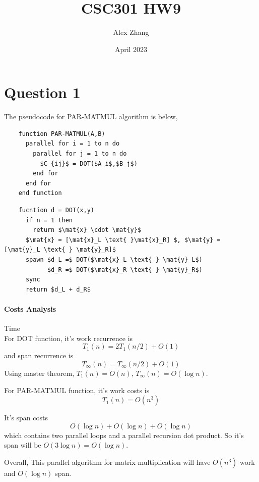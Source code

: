 \documentclass{article}
\title{CSC301 HW9}
\author{Alex Zhang}
\date{April 2023}
\newcommand{\mat}[1]{\mathbf{#1}}
\begin{document}
\maketitle

\section*{Question 1}

The pseudocode for PAR-MATMUL algorithm is below,
\begin{multicols}{2}
  \begin{lstlisting}
    function PAR-MATMUL(A,B)
      parallel for i = 1 to n do
        parallel for j = 1 to n do
          $C_{ij}$ = DOT($A_i$,$B_j$)
        end for
      end for
    end function
  \end{lstlisting}
  \begin{lstlisting}
    fucntion d = DOT(x,y)
      if n = 1 then
        return $\mat{x} \cdot \mat{y}$
      $\mat{x} = [\mat{x}_L \text{ }\mat{x}_R] $, $\mat{y} = [\mat{y}_L \text{ } \mat{y}_R]$
      spawn $d_L =$ DOT($\mat{x}_L \text{ } \mat{y}_L$)
            $d_R =$ DOT($\mat{x}_R \text{ } \mat{y}_R$)
      sync 
      return $d_L + d_R$ 
  \end{lstlisting}
\end{multicols} 
\paragraph{Costs Analysis} Time\\

For DOT function, it's work recurrence is 
$$T_1(n) = 2T_1(n/2) + O(1)$$
and span recurrence is 
$$T_{\infty}(n) = T_{\infty}(n/2) + O(1)$$
Using master theorem, $T_1(n) = O(n)$, $T_{\infty}(n) = O(\log n)$.


For PAR-MATMUL function, it's work costs is 
$$T_1(n) = O(n^3)$$

It's span costs $$O(\log n) + O(\log n) + O(\log n)$$
which contains two parallel loops and a parallel recursion dot product.
So it's span will be $O(3\log n) = O(\log n)$.



Overall, This parallel algorithm for matrix multiplication will have $O(n^3)$ work and $O(\log n)$ span.
\end{document}
